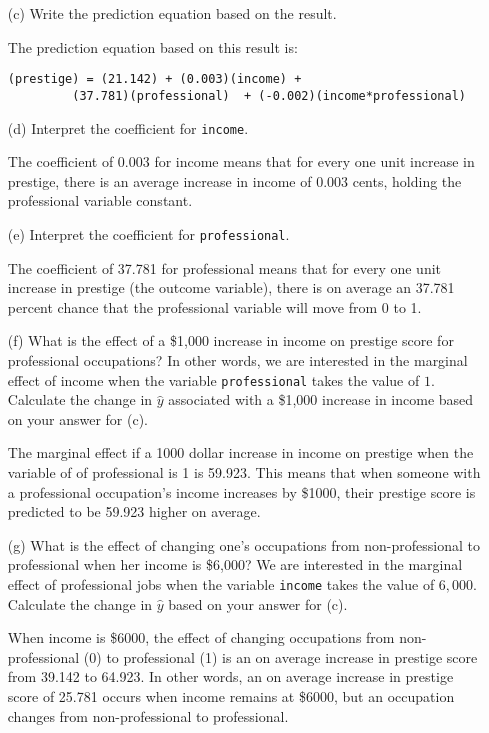 \documentclass[12pt,letterpaper]{article}
\begin{document}
\begin{enumerate}
	\vspace{2cm}
	
	\item [(c)]
	Write the prediction equation based on the result.
	
	The prediction equation based on this result is:
\begin{verbatim}
(prestige) = (21.142) + (0.003)(income) +
         (37.781)(professional)  + (-0.002)(income*professional)
\end{verbatim}
	

	\item [(d)]
	Interpret the coefficient for \texttt{income}.
	
	The coefficient of 0.003 for income means that for every one unit increase in 
	prestige, there is an average increase in income of 0.003 cents, holding the professional variable constant.
	
	\vspace{1cm}	
	
	\item [(e)]
	Interpret the coefficient for \texttt{professional}.
	
	The coefficient of 37.781 for professional means that for every one unit increase
	in prestige (the outcome variable), there is on average an 37.781 percent chance that the professional variable will move from 0 to 1.
	
	\item [(f)]
	What is the effect of a \$1,000 increase in income on prestige score for professional occupations? In other words, we are interested in the marginal effect of income when the variable \texttt{professional} takes the value of $1$. Calculate the change in $\hat{y}$ associated with a \$1,000 increase in income based on your answer for (c).
	
	The marginal effect if a 1000 dollar increase in income on prestige when the variable of 
	of professional is 1 is 59.923. This means that when someone with a professional occupation's income increases by \$1000, their prestige score is predicted to be 59.923 higher on average.
	
	\vspace{1cm}
	
	
	\item [(g)]
	What is the effect of changing one's occupations from non-professional to professional when her income is \$6,000? We are interested in the marginal effect of professional jobs when the variable \texttt{income} takes the value of $6,000$. Calculate the change in $\hat{y}$ based on your answer for (c).
	
	When income is \$6000, the effect of changing occupations from non-professional (0) to professional (1) is an on average increase in prestige score from 39.142 to 64.923. In other words, an on average increase in prestige score of 25.781 occurs when income remains at \$6000, but an occupation changes from non-professional to professional.
	
	
\end{enumerate}
\end{document}
